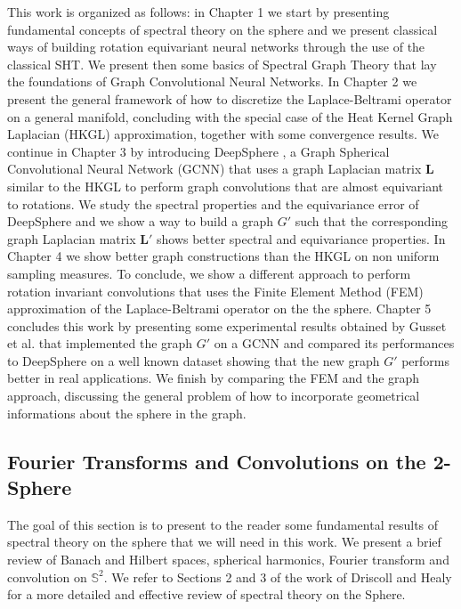 This work is organized as follows: in Chapter 1 we start by presenting fundamental concepts of spectral theory on the sphere and we present classical ways of building rotation equivariant neural networks through the use of the classical SHT.  We present then some basics of Spectral Graph Theory that lay the foundations of Graph Convolutional Neural Networks.  In Chapter 2 we present the general framework of how to discretize the Laplace-Beltrami operator on a general manifold, concluding with the special case of the Heat Kernel Graph Laplacian (HKGL) approximation, together with some convergence results. We continue in Chapter 3 by introducing DeepSphere \cite{DeepSphere}, a Graph Spherical Convolutional Neural Network (GCNN) that uses a graph Laplacian matrix $\mathbf L$ similar to the HKGL to perform graph convolutions that are almost equivariant to rotations. We study the spectral properties and the equivariance error of DeepSphere and we show a way to build a graph $G'$ such that the corresponding graph Laplacian matrix $\mathbf L'$ shows better spectral and equivariance properties. In Chapter 4 we show better graph constructions than the HKGL on non uniform sampling measures. To conclude, we show a different approach to perform rotation invariant convolutions that uses the Finite Element Method (FEM) approximation of the Laplace-Beltrami operator on the the sphere. Chapter 5 concludes this work by presenting some experimental results obtained by Gusset et al. \cite{Gusset} that implemented the graph $G'$ on a GCNN and compared its performances to DeepSphere on a well known dataset \cite{SHREC17} showing that the new graph $G'$ performs better in real applications. We finish by comparing the FEM and the graph approach, discussing the general problem of how to incorporate geometrical informations about the sphere in the graph.

\subsection{Fourier Transforms and Convolutions on the 2-Sphere}\label{sec:Fourier on the Sphere}
The goal of this section is to present to the reader some fundamental results of spectral theory on the sphere that we will need in this work. We present a brief review of Banach and Hilbert spaces, spherical harmonics, Fourier transform and convolution on $\mathbb S^2$. We refer to Sections 2 and 3 of the work of Driscoll and Healy \cite{Driscoll:1994:CFT:184069.184073} for a more detailed and effective review of spectral theory on the Sphere.

